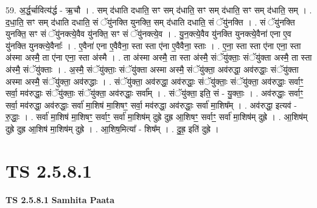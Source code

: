 \documentclass[17pt]{extarticle}
\begin{document}
59. अ॒र्द्ध॒र्चावित्य॑र्द्ध - ऋ॒चौ । . सम् द॑धाति दधाति॒ सꣳ सम् द॑धाति॒ सꣳ सम् द॑धाति॒ सꣳ सम् द॑धाति॒ सम् । . द॒धा॒ति॒ सꣳ सम् द॑धाति दधाति॒ सं ॅयु॑नक्ति युनक्ति॒ सम् द॑धाति दधाति॒ सं ॅयु॑नक्ति । . सं ॅयु॑नक्ति युनक्ति॒ सꣳ सं ॅयु॑नक्त्ये॒वैव यु॑नक्ति॒ सꣳ सं ॅयु॑नक्त्ये॒व । . यु॒न॒क्त्ये॒वैव यु॑नक्ति युनक्त्ये॒वैना॑ एना ए॒व यु॑नक्ति युनक्त्ये॒वैनाः᳚ । . ए॒वैना॑ एना ए॒वैवैना॒ स्ता स्ता ए॑ना ए॒वैवैना॒ स्ताः । . ए॒ना॒ स्ता स्ता ए॑ना एना॒ स्ता अ॑स्मा अस्मै॒ ता ए॑ना एना॒ स्ता अ॑स्मै । . ता अ॑स्मा अस्मै॒ ता स्ता अ॑स्मै॒ संॅयु॑क्ताः॒ संॅयु॑क्ता अस्मै॒ ता स्ता अ॑स्मै॒ संॅयु॑क्ताः । . अ॒स्मै॒ संॅयु॑क्ताः॒ संॅयु॑क्ता अस्मा अस्मै॒ संॅयु॑क्ता॒ अव॑रुद्धा॒ अव॑रुद्धाः॒ संॅयु॑क्ता अस्मा अस्मै॒ संॅयु॑क्ता॒ अव॑रुद्धाः । . संॅयु॑क्ता॒ अव॑रुद्धा॒ अव॑रुद्धाः॒ संॅयु॑क्ताः॒ संॅयु॑क्ता॒ अव॑रुद्धाः॒ सर्वाꣳ॒॒ सर्वा॒ मव॑रुद्धाः॒ संॅयु॑क्ताः॒ संॅयु॑क्ता॒ अव॑रुद्धाः॒ सर्वा᳚म् । . संॅयु॑क्ता॒ इति॒ सं - यु॒क्ताः॒ । . अव॑रुद्धाः॒ सर्वाꣳ॒॒ सर्वा॒ मव॑रुद्धा॒ अव॑रुद्धाः॒ सर्वा॑ मा॒शिष॑ मा॒शिषꣳ॒॒ सर्वा॒ मव॑रुद्धा॒ अव॑रुद्धाः॒ सर्वा॑ मा॒शिष᳚म् । . अव॑रुद्धा॒ इत्यव॑ - रु॒द्धाः॒ । . सर्वा॑ मा॒शिष॑ मा॒शिषꣳ॒॒ सर्वाꣳ॒॒ सर्वा॑ मा॒शिष॑म् दुह्रे दुह्र आ॒शिषꣳ॒॒ सर्वाꣳ॒॒ सर्वा॑ मा॒शिष॑म् दुह्रे । . आ॒शिष॑म् दुह्रे दुह्र आ॒शिष॑ मा॒शिष॑म् दुह्रे । . आ॒शिष॒मित्या᳚ - शिष᳚म् । . दु॒ह्र॒ इति॑ दुह्रे । \newline
\pagebreak
{}
\section*{ TS 2.5.8.1 }

\textbf{TS 2.5.8.1 } \newline
\textbf{Samhita Paata} \newline
\end{document}
